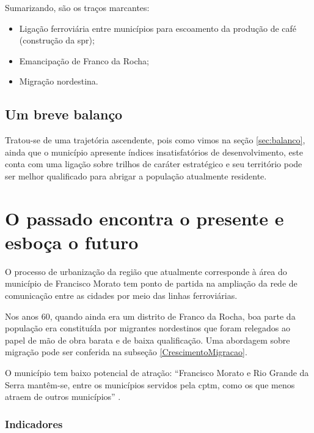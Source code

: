 	Sumarizando, são os traços marcantes:
	
	\begin{itemize}
		\item Ligação ferroviária entre municípios para escoamento da produção de café (construção da \gls{spr});
		\item Emancipação de Franco da Rocha;
		\item Migração nordestina.
	\end{itemize}
	
	\section{Um breve balanço}
		
	Tratou-se de uma trajetória ascendente, pois como vimos na seção \ref{sec:balanco}, ainda que o município apresente índices insatisfatórios de desenvolvimento, este conta com uma ligação sobre trilhos de caráter estratégico e seu território pode ser melhor qualificado para abrigar a população atualmente residente.

	\chapter{O passado encontra o presente e esboça o futuro}
	
	O processo de urbanização da região que atualmente corresponde à área do município de Francisco Morato tem ponto de partida na ampliação da rede de comunicação entre as cidades por meio das linhas ferroviárias.
	
	Nos anos 60, quando ainda era um distrito de Franco da Rocha, boa parte da população era constituída por migrantes nordestinos que foram relegados ao papel de mão de obra barata e de baixa qualificação. Uma abordagem sobre migração pode ser conferida na subseção \ref{CrescimentoMigracao}.
	
	O município tem baixo potencial de atração: ``Francisco Morato e Rio Grande da Serra mantêm-se, entre os municípios servidos pela \gls{cptm}, como os que menos atraem de outros municípios'' \cite[p.80]{ferreira2010a}.
	
	\subsection{Indicadores}
	
